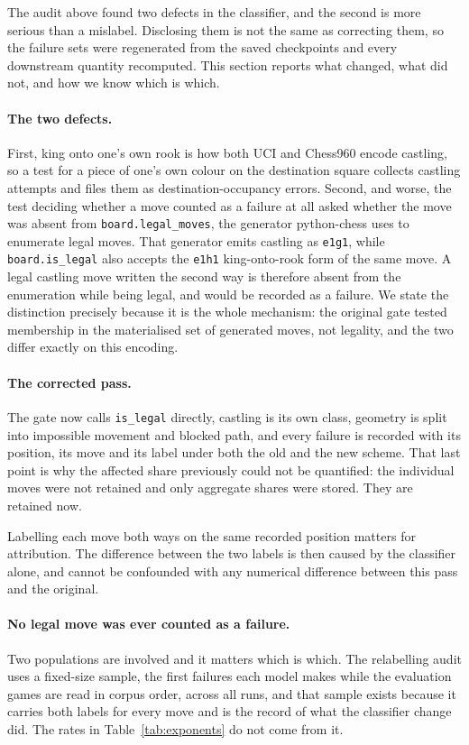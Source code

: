 \documentclass[11pt]{article}
\begin{document}
The audit above found two defects in the classifier, and the second is more serious
than a mislabel. Disclosing them is not the same as correcting them, so the failure
sets were regenerated from the saved checkpoints and every downstream quantity
recomputed. This section reports what changed, what did not, and how we know which
is which.

\paragraph{The two defects.}
First, king onto one's own rook is how both UCI and Chess960 encode castling, so a
test for a piece of one's own colour on the destination square collects castling
attempts and files them as destination-occupancy errors. Second, and worse, the test
deciding whether a move counted as a failure at all asked whether the move was absent
from \texttt{board.legal\_moves}, the generator python-chess uses to enumerate legal
moves. That generator emits castling as \texttt{e1g1}, while \texttt{board.is\_legal} also
accepts the \texttt{e1h1} king-onto-rook form of the same move. A legal castling move
written the second way is therefore absent from the enumeration while being legal, and
would be recorded as a failure. We state the distinction precisely because it is the
whole mechanism: the original gate tested membership in the materialised set of
generated moves, not legality, and the two differ exactly on this encoding.

\paragraph{The corrected pass.}
The gate now calls \texttt{is\_legal} directly, castling is its own class, geometry is
split into impossible movement and blocked path, and every failure is recorded with
its position, its move and its label under both the old and the new scheme. That last
point is why the affected share previously could not be quantified: the individual
moves were not retained and only aggregate shares were stored. They are retained now.

Labelling each move both ways on the same recorded position matters for attribution.
The difference between the two labels is then caused by the classifier alone, and
cannot be confounded with any numerical difference between this pass and the original.

\paragraph{No legal move was ever counted as a failure.}
Two populations are involved and it matters which is which. The relabelling audit
uses a fixed-size sample, the first  failures each model makes while the
evaluation games are read in corpus order,  across all  runs, and that
sample exists because it carries both labels for every move and is the record of what
the classifier change did. The rates in Table~\ref{tab:exponents} do not come from it.
\end{document}
